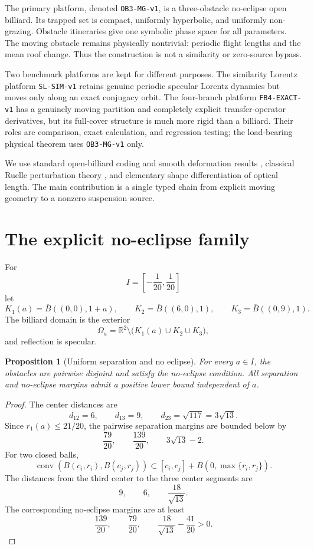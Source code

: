 \documentclass[11pt,reqno]{amsart}
\newtheorem{proposition}[theorem]{Proposition}
\theoremstyle{definition}
\theoremstyle{remark}
\newcommand{\R}{\mathbb R}
\begin{document}
The primary platform, denoted \texttt{OB3-MG-v1}, is a three-obstacle
no-eclipse open billiard.  Its trapped set is compact, uniformly hyperbolic,
and uniformly non-grazing.  Obstacle itineraries give one symbolic phase space
for all parameters.  The moving obstacle remains physically nontrivial:
periodic flight lengths and the mean roof change.  Thus the construction is not
a similarity or zero-source bypass.

Two benchmark platforms are kept for different purposes.  The similarity
Lorentz platform \texttt{SL-SIM-v1} retains genuine periodic specular Lorentz
dynamics but moves only along an exact conjugacy orbit.  The four-branch
platform \texttt{FB4-EXACT-v1} has a genuinely moving partition and completely
explicit transfer-operator derivatives, but its full-cover structure is much
more rigid than a billiard.  Their roles are comparison, exact calculation,
and regression testing; the load-bearing physical theorem uses
\texttt{OB3-MG-v1} only.

We use standard open-billiard coding and smooth deformation results
\cite{Bowen1975,ChernovMarkarian2006,Wright2016}, classical Ruelle
perturbation theory \cite{Ruelle1978,ParryPollicott1990,Kato1995}, and elementary
shape differentiation of optical length.  The main contribution is a single
typed chain from explicit moving geometry to a nonzero suspension source.

\section{The explicit no-eclipse family}\label{sec:geometry}

For
\[
 I=\left[-\frac1{20},\frac1{20}\right]
\]
let
\[
 K_1(a)=\overline B((0,0),1+a),\qquad
 K_2=\overline B((6,0),1),\qquad
 K_3=\overline B((0,9),1).
\]
The billiard domain is the exterior
\[
 \Omega_a=\R^2\setminus\bigl(K_1(a)\cup K_2\cup K_3\bigr),
\]
and reflection is specular.

\begin{proposition}[Uniform separation and no eclipse]\label{prop:no-eclipse}
For every $a\in I$, the obstacles are pairwise disjoint and satisfy the
no-eclipse condition.  All separation and no-eclipse margins admit a positive
lower bound independent of $a$.
\end{proposition}

\begin{proof}
The center distances are
\[
 d_{12}=6,\qquad d_{13}=9,\qquad d_{23}=\sqrt{117}=3\sqrt{13}.
\]
Since $r_1(a)\le21/20$, the pairwise separation margins are bounded below by
\[
 \frac{79}{20},\qquad \frac{139}{20},\qquad 3\sqrt{13}-2.
\]
For two closed balls,
\[
 \operatorname{conv}(B(c_i,r_i),B(c_j,r_j))
 \subset [c_i,c_j]+B(0,\max\{r_i,r_j\}).
\]
The distances from the third center to the three center segments are
\[
 9,\qquad 6,\qquad \frac{18}{\sqrt{13}}.
\]
The corresponding no-eclipse margins are at least
\[
 \frac{139}{20},\qquad \frac{79}{20},\qquad
 \frac{18}{\sqrt{13}}-\frac{41}{20}>0.
\]
\end{proof}
\end{document}
